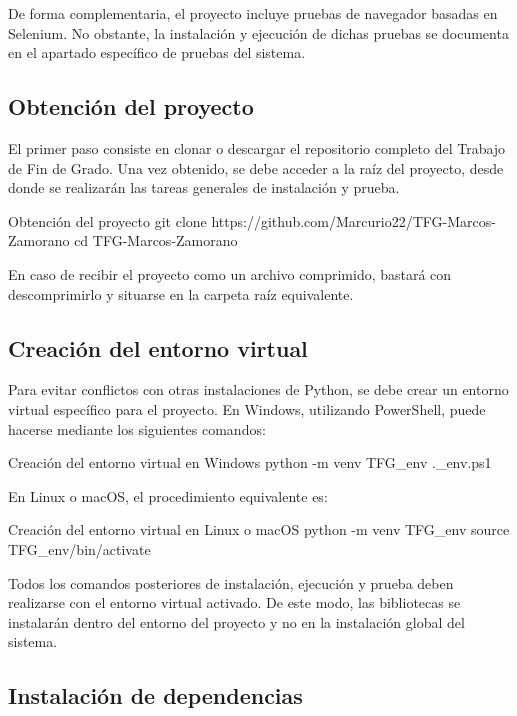 De forma complementaria, el proyecto incluye pruebas de navegador basadas en Selenium. No obstante, la instalación y ejecución de dichas pruebas se documenta en el apartado específico de pruebas del sistema.

\subsection{Obtención del proyecto}

El primer paso consiste en clonar o descargar el repositorio completo del Trabajo de Fin de Grado. Una vez obtenido, se debe acceder a la raíz del proyecto, desde donde se realizarán las tareas generales de instalación y prueba.

\begin{gitbox}{Obtención del proyecto}
git clone https://github.com/Marcurio22/TFG-Marcos-Zamorano
cd TFG-Marcos-Zamorano
\end{gitbox}

En caso de recibir el proyecto como un archivo comprimido, bastará con descomprimirlo y situarse en la carpeta raíz equivalente.

\subsection{Creación del entorno virtual}

Para evitar conflictos con otras instalaciones de Python, se debe crear un entorno virtual específico para el proyecto. En Windows, utilizando PowerShell, puede hacerse mediante los siguientes comandos:

\begin{windowsbox}{Creación del entorno virtual en Windows}
python -m venv TFG_env
.\TFG_env\Scripts\Activate.ps1
\end{windowsbox}

En Linux o macOS, el procedimiento equivalente es:

\begin{linuxbox}{Creación del entorno virtual en Linux o macOS}
python -m venv TFG_env
source TFG_env/bin/activate
\end{linuxbox}

Todos los comandos posteriores de instalación, ejecución y prueba deben realizarse con el entorno virtual activado. De este modo, las bibliotecas se instalarán dentro del entorno del proyecto y no en la instalación global del sistema.

\subsection{Instalación de dependencias}

